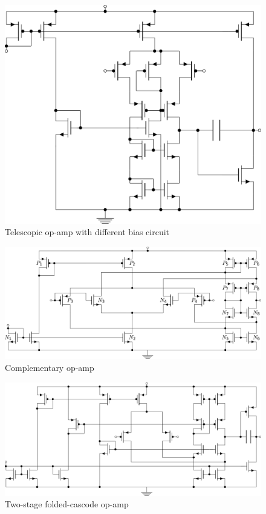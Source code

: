 \begin{figure}[H]
	\centering
	\includegraphics[width=0.7\linewidth]{Fig/OpAmpWitCascodeFirstStageInnerBias.PNG}
	\caption{Telescopic op-amp with different bias circuit} \label{fig:telescopicOpAmp2}
\end{figure}

\begin{figure}[H]
	\centering
	\includegraphics[width=\linewidth]{Fig/RailToRailAmplifier.PNG}
	\caption{Complementary op-amp} \label{fig:complementaryOpAmp2}
\end{figure}

\begin{figure}[H]
	\centering
	\includegraphics[width=\linewidth]{Fig/TwoStageFoldedCascodeOpAmp.PNG}
	\caption{Two-stage folded-cascode op-amp} \label{fig:twoStageFoldedCascodeOpAmp}
\end{figure}


